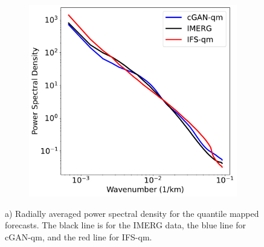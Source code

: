\documentclass{article}
\begin{document}
\begin{figure}[!ht]
     \centering
     \begin{subfigure}{0.48\textwidth}
     \includegraphics[width=\textwidth]{images/rapsd_final-nologs_217600.pdf}
     \caption{}
     \end{subfigure}
     
     \caption{a) Radially averaged power spectral density for the quantile mapped forecasts. The black line is for the IMERG data, the blue line for cGAN-qm, and the red line for IFS-qm. 
}
     \label{fig:rapsd}
\end{figure}
\end{document}
